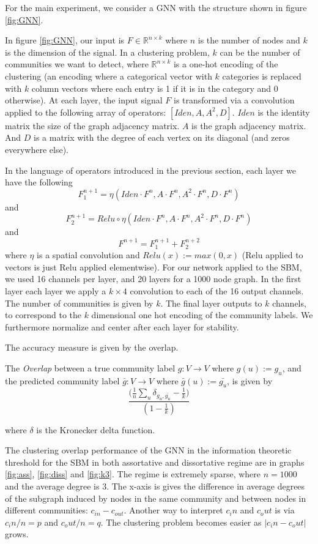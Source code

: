For the main experiment, we consider a GNN with the structure shown in figure \ref{fig:GNN}.

In figure \ref{fig:GNN}, our input is $F\in \mathbb{R}^{n \times k}$ where $n$ is the number of nodes and $k$ is the dimension of the signal.  In a clustering problem, $k$ can be the number of communities we want to detect, where $\mathbb{R}^{n\times k}$ is a one-hot encoding of the clustering (an encoding where a categorical vector with $k$ categories is replaced with $k$ column vectors where each entry is 1 if it is in the category and 0 otherwise). At each layer, the input signal $F$ is transformed via a convolution applied to the following array of operators:  $[Iden, A, A^2, D]$.  $Iden$ is the identity matrix the size of the graph adjacency matrix.  $A$ is the graph adjacency matrix.  And $D$ is a matrix with the degree of each vertex on its diagonal (and zeros everywhere else). 

In the language of operators introduced in the previous section, each layer we have the following $$ F_1^{n+1} = \eta(Iden \cdot F^n, A \cdot F^n, A^2 \cdot F^n, D \cdot F^n)$$ and $$ F_2^{n+1} = Relu \circ \eta(Iden \cdot F^n, A \cdot F^n, A^2 \cdot F^n, D \cdot F^n)$$ and $$ F^{n+1} = F_1^{n+1}+F_2^{n+2}$$
where $\eta$ is a spatial convolution and $Relu(x) := max(0, x)$ (Relu applied to vectors is just Relu applied elementwise).  For our network applied to the SBM, we used 16 channels per layer, and 20 layers for a 1000 node graph. In the first layer each layer we apply a $k \times 4$ convolution to each of the 16 output channels.  The number of communities is given by $k$.  The final layer outputs to $k$ channels, to correspond to the $k$ dimensional one hot encoding of the community labels. We furthermore normalize and center after each layer for stability.  

The accuracy measure is given by the overlap. 
\begin{definition}The \textit{Overlap} between a true community label $g: V \rightarrow V$ where $g(u) := g_u$, and the predicted community label $\bar{g}:V \rightarrow V$ where $\bar{g}(u) := \bar{g_u}$, is given by
$$ \frac{\big(\frac{1}{n}\sum_u \delta_{g_u, \bar{g_u}} - \frac{1}{k}\big)}{(1-\frac{1}{k})}$$

where $\delta$ is the Kronecker delta function.  
\end{definition}

The clustering overlap performance of the GNN in the information theoretic threshold for the SBM in both assortative and dissortative regime are in graphs \ref{fig:ass}, \ref{fig:diss} and \ref{fig:k3}.  The regime is extremely sparse, where $n =1000$ and the average degree is $3$.  The x-axis is gives the difference in average degrees of the subgraph induced by nodes in the same community and between nodes in different communities: $c_{in} - c_{out}$.  Another way to interpret $c_in$ and $c_out$ is via $c_in/n = p$ and $c_out/n = q$.  The clustering problem becomes easier as $|c_in-c_out|$ grows.  

